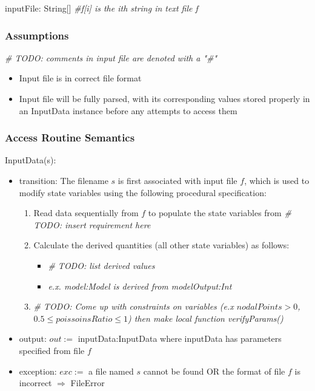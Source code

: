 \documentclass[12pt, titlepage]{article}
\begin{document}
inputFile: String[] \emph{\#f[i] is the ith string in text file f}

\subsubsection{Assumptions}

\emph{\# TODO: comments in input file are denoted with a "\#"}
\begin{itemize}
  \item Input file is in correct file format
  \item Input file will be fully parsed, with its corresponding values 
  stored properly in an InputData instance before any attempts to access 
  them
\end{itemize}

\subsubsection{Access Routine Semantics}

\noindent InputData(s):
\begin{itemize}
\item transition: 
The filename $s$ is first associated with input file $f$, which is
used to modify state variables using the following procedural specification:
  \begin{enumerate}
    \item Read data sequentially from $f$ to populate the state variables
    from \emph{\# TODO: insert requirement here}
    \item Calculate the derived quantities (all other state variables) as follows:
      \begin{itemize}
        \item \emph{\# TODO: list derived values}
        \item \emph{e.x. model:Model is derived from modelOutput:Int}
      \end{itemize}
    \item \emph{\# TODO: Come up with constraints on variables (e.x $nodalPoints > 0$, 
    $0.5 \le poissoinsRatio \le 1$) then make local function verifyParams()}
  \end{enumerate}
\item output: $out := $ inputData:InputData where inputData has parameters specified from file $f$ 
\item exception: $exc := $ a file named $s$ cannot be found OR the format of file $f$ is incorrect 
$\Rightarrow$ FileError
\end{itemize}
\end{document}

